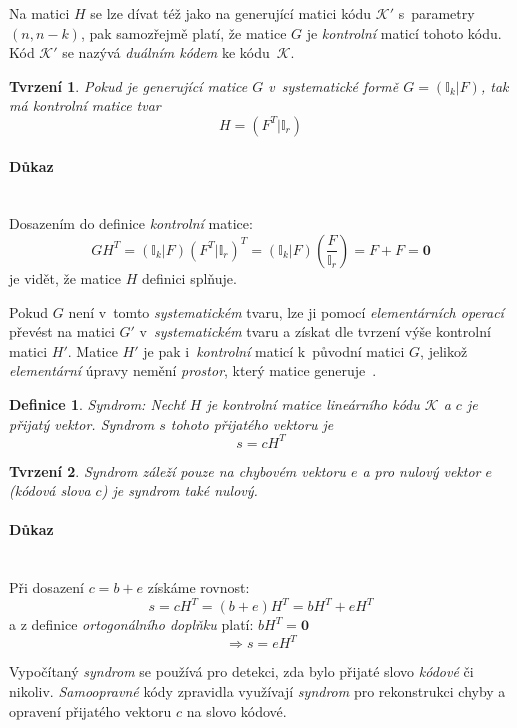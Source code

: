 \documentclass[thesis=M,czech,hidelinks]{FITthesis}[2012/06/26]
\newcommand{\0}{{\textcolor[gray]{0.80}{0}}}
\newtheorem{tvrzeni}{Tvrzení}
\newtheorem{definice}{Definice}
\begin{document}
Na matici $H$ se lze dívat též jako na generující matici kódu $\mathcal{K}'$
s~parametry $(n,n-k)$, pak samozřejmě platí, že matice $G$ je \emph{kontrolní}
maticí tohoto kódu. Kód $\mathcal{K}'$ se nazývá \emph{duálním kódem} ke
kódu~$\mathcal{K}$.


\begin{tvrzeni}
    Pokud je \emph{generující} matice $G$ v~systematické formě
    $G=(\mathbb{I}_k|F)$, tak má \emph{kontrolní} matice tvar
    $$ H=(F^T|\mathbb{I}_r) $$
\end{tvrzeni}

\paragraph{Důkaz} \hfil \\
Dosazením do definice \emph{kontrolní} matice:
$$
    G H^T = (\mathbb{I}_k|F)(F^T|\mathbb{I}_r)^T =
    (\mathbb{I}_k|F)(\frac{F}{\mathbb{I}_r}) = F + F = \textbf{0}
$$
je vidět, že matice $H$ definici splňuje.

Pokud $G$ není v~tomto \emph{systematickém} tvaru, lze ji pomocí
\emph{elementárních operací} převést na matici $G'$ v~\emph{systematickém} tvaru
a získat dle tvrzení výše kontrolní matici $H'$. Matice $H'$ je pak
i~\emph{kontrolní} maticí k~původní matici $G$, jelikož \emph{elementární}
úpravy nemění \emph{prostor}, který matice generuje~\cite{Adamek}.

\begin{definice}{Syndrom:}
    Nechť $H$ je \emph{kontrolní} matice \emph{lineárního} kódu $\mathcal{K}$ a
    $c$ je přijatý vektor. \emph{Syndrom} $s$ tohoto přijatého vektoru je
    $$ s = c H^T $$
\end{definice}

\begin{tvrzeni}
    \emph{Syndrom} záleží pouze na chybovém vektoru $e$ a pro nulový vektor $e$
    (kódová slova $c$) je syndrom také \emph{nulový}.
\end{tvrzeni}

\paragraph{Důkaz} \hfil \\
Při dosazení $c=b+e$ získáme rovnost:
$$ s = c H^T = (b+e)H^T = b H^T + e H^T $$
a z definice \emph{ortogonálního doplňku} platí: $ b H^T = \textbf{0} $
$$ \Rightarrow s = e H^T $$

Vypočítaný \emph{syndrom} se používá pro detekci, zda bylo přijaté slovo
\emph{kódové} či nikoliv. \emph{Samoopravné} kódy zpravidla využívají
\emph{syndrom} pro rekonstrukci chyby a opravení přijatého vektoru $c$ na slovo
kódové.
\end{document}
